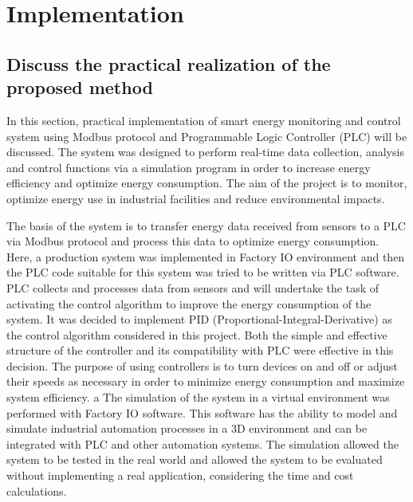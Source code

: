 \doublespacing %

\chapter{Implementation}
\label{ch4}

\begin{spacing}{1} %
\minitoc %
\end{spacing} %
\thesisspacing %
\section{Discuss the practical realization of the proposed method}
In this section, practical implementation of smart energy monitoring and control system using Modbus protocol and Programmable Logic Controller (PLC) will be discussed. The system was designed to perform real-time data collection, analysis and control functions via a simulation program in order to increase energy efficiency and optimize energy consumption. The aim of the project is to monitor, optimize energy use in industrial facilities and reduce environmental impacts.

The basis of the system is to transfer energy data received from sensors to a PLC via Modbus protocol and process this data to optimize energy consumption. Here, a production system was implemented in Factory IO environment and then the PLC code suitable for this system was tried to be written via PLC software. PLC collects and processes data from sensors and will undertake the task of activating the control algorithm to improve the energy consumption of the system. It was decided to implement PID (Proportional-Integral-Derivative) as the control algorithm considered in this project. Both the simple and effective structure of the controller and its compatibility with PLC were effective in this decision. The purpose of using controllers is to turn devices on and off or adjust their speeds as necessary in order to minimize energy consumption and maximize system efficiency.
a
The simulation of the system in a virtual environment was performed with Factory IO software. This software has the ability to model and simulate industrial automation processes in a 3D environment and can be integrated with PLC and other automation systems. The simulation allowed the system to be tested in the real world and allowed the system to be evaluated without implementing a real application, considering the time and cost calculations.

